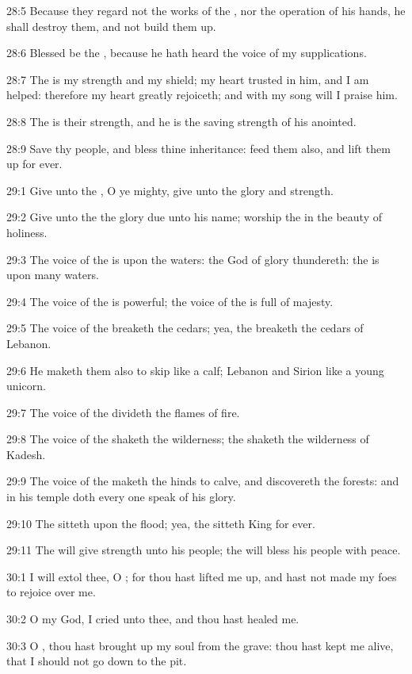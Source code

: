 28:5 Because they regard not the works of the \LORD, nor the operation of his hands, he shall destroy them, and not build them up.

28:6 Blessed be the \LORD, because he hath heard the voice of my supplications.

28:7 The \LORD is my strength and my shield; my heart trusted in him, and I am helped: therefore my heart greatly rejoiceth; and with my song will I praise him.

28:8 The \LORD is their strength, and he is the saving strength of his anointed.

28:9 Save thy people, and bless thine inheritance: feed them also, and lift them up for ever.



29:1 Give unto the \LORD, O ye mighty, give unto the \LORD glory and strength.

29:2 Give unto the \LORD the glory due unto his name; worship the \LORD in the beauty of holiness.

29:3 The voice of the \LORD is upon the waters: the God of glory thundereth: the \LORD is upon many waters.

29:4 The voice of the \LORD is powerful; the voice of the \LORD is full of majesty.

29:5 The voice of the \LORD breaketh the cedars; yea, the \LORD breaketh the cedars of Lebanon.

29:6 He maketh them also to skip like a calf; Lebanon and Sirion like a young unicorn.

29:7 The voice of the \LORD divideth the flames of fire.

29:8 The voice of the \LORD shaketh the wilderness; the \LORD shaketh the wilderness of Kadesh.

29:9 The voice of the \LORD maketh the hinds to calve, and discovereth the forests: and in his temple doth every one speak of his glory.

29:10 The \LORD sitteth upon the flood; yea, the \LORD sitteth King for ever.

29:11 The \LORD will give strength unto his people; the \LORD will bless his people with peace.



30:1 I will extol thee, O \LORD; for thou hast lifted me up, and hast not made my foes to rejoice over me.

30:2 O \LORD my God, I cried unto thee, and thou hast healed me.

30:3 O \LORD, thou hast brought up my soul from the grave: thou hast kept me alive, that I should not go down to the pit.

